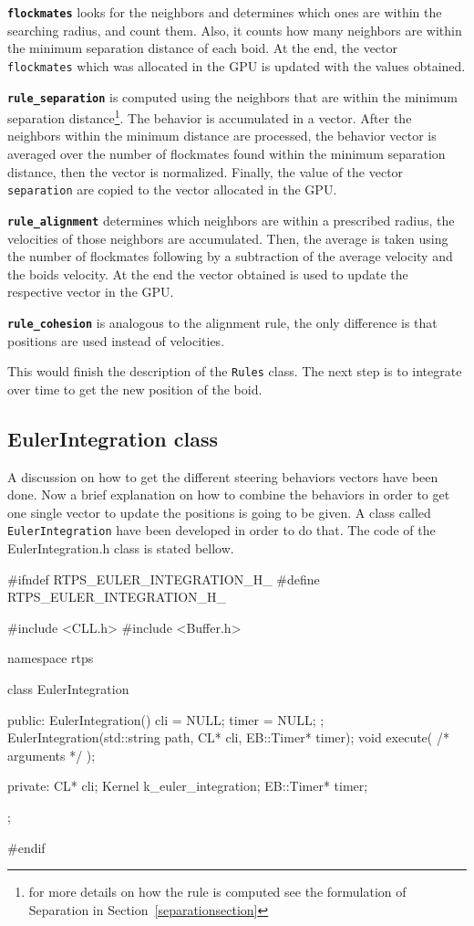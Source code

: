 \texttt{\textbf{flockmates}} looks for the neighbors and determines which ones are within the searching radius, and count them. Also, it counts how many neighbors are within the minimum separation distance of each boid. At the end, the vector \texttt{flockmates} which was allocated in the GPU is updated with the values obtained.

\texttt{\textbf{rule\_separation}} is computed using the neighbors that are within the minimum separation distance\footnote{for more details on how the rule is computed see the formulation of Separation in Section~\ref{separationsection}}. The behavior is accumulated in a vector. After the neighbors within the minimum distance are processed, the behavior vector is averaged over the number of flockmates found within the minimum separation distance, then the vector is normalized. Finally, the value of the vector \texttt{separation} are copied to the vector allocated in the GPU.

\texttt{\textbf{rule\_alignment}} determines which neighbors are within a prescribed radius, the velocities of those neighbors are accumulated. Then, the average is taken using the number of flockmates following by a subtraction of the average velocity and the boids velocity. At the end the vector obtained is used to update the respective vector in the GPU. 

\texttt{\textbf{rule\_cohesion}} is analogous to the alignment rule, the only difference is that positions are used instead of velocities.


This would finish the description of the \texttt{Rules} class. The next step is to integrate over time to get the new position of the boid.

\subsection{EulerIntegration class}
A discussion on how to get the different steering behaviors vectors have been done. Now a brief explanation on how to combine the behaviors in order to get one single vector to update the positions is going to be given. A class called \texttt{EulerIntegration} have been developed in order to do that. The code of the {EulerIntegration.h} class is stated bellow.

\begin{cppcode}{0}
#ifndef RTPS_EULER_INTEGRATION_H_
#define RTPS_EULER_INTEGRATION_H_

#include <CLL.h>
#include <Buffer.h>

namespace rtps
{
	class EulerIntegration
	{
		public:
			EulerIntegration() { cli = NULL; timer = NULL; };
	 		EulerIntegration(std::string path, CL* cli, EB::Timer* timer);
			void execute( /* arguments */ );

		private:
			CL* cli;
			Kernel k_euler_integration;
			EB::Timer* timer;
	};
}
#endif
\end{cppcode}

